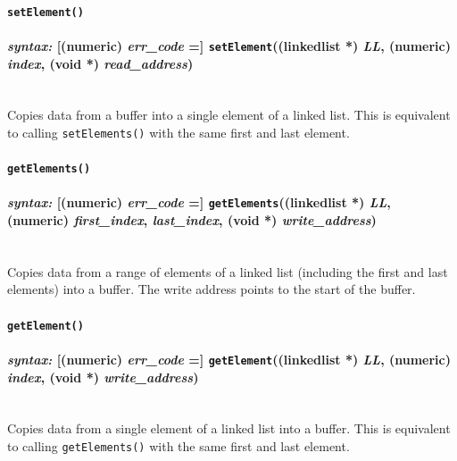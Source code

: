 \documentclass{article}
\begin{document}
\paragraph{\texttt{setElement()}\\\\
\normalfont \emph{syntax: } [(numeric) \emph{err\_code} =] \texttt{setElement}((linkedlist *) \emph{LL}, (numeric) \emph{index}, (void *) \emph{read\_address})\\\\}

Copies data from a buffer into a single element of a linked list.  This is equivalent to calling \texttt{setElements()} with the same first and last element.\\




\paragraph{\texttt{getElements()}\\\\
\normalfont \emph{syntax: } [(numeric) \emph{err\_code} =] \texttt{getElements}((linkedlist *) \emph{LL}, (numeric) \emph{first\_index}, \emph{last\_index}, (void *) \emph{write\_address})\\\\}

Copies data from a range of elements of a linked list (including the first and last elements) into a buffer.  The write address points to the start of the buffer.\\




\paragraph{\texttt{getElement()}\\\\
\normalfont \emph{syntax: } [(numeric) \emph{err\_code} =] \texttt{getElement}((linkedlist *) \emph{LL}, (numeric) \emph{index}, (void *) \emph{write\_address})\\\\}

Copies data from a single element of a linked list into a buffer.  This is equivalent to calling \texttt{getElements()} with the same first and last element.\\
\end{document}
